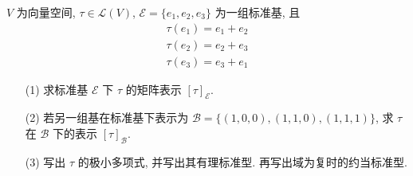 \documentclass{assignment}
\begin{document}
\begin{prob}
    $V$ 为向量空间, $\tau\in\mathcal{L}(V)$, $\mathcal{E}=\{e_1,e_2,e_3\}$ 为一组标准基, 且
    \[
        \begin{array}{l}
            \tau(e_1)=e_1+e_2\\
            \tau(e_2)=e_2+e_3\\
            \tau(e_3)=e_3+e_1
        \end{array}
    \]
    \begin{itemize}
        \item[(1)] 求标准基 $\mathcal{E}$ 下 $\tau$ 的矩阵表示 $[\tau]_{\mathcal{E}}$.
        \item[(2)] 若另一组基在标准基下表示为 $\mathcal{B}=\{(1,0,0),(1,1,0),(1,1,1)\}$, 求 $\tau$ 在 $\mathcal{B}$ 下的表示 $[\tau]_{\mathcal{B}}$.
        \item[(3)] 写出 $\tau$ 的极小多项式, 并写出其有理标准型. 再写出域为复时的约当标准型.
    \end{itemize}
\end{prob}
\end{document}
